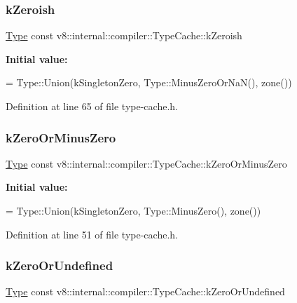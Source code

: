 \subsubsection{\texorpdfstring{k\+Zeroish}{kZeroish}}
{\footnotesize\ttfamily \mbox{\hyperlink{classv8_1_1internal_1_1compiler_1_1Type}{Type}} const v8\+::internal\+::compiler\+::\+Type\+Cache\+::k\+Zeroish}

{\bfseries Initial value\+:}
\begin{DoxyCode}
=
      Type::Union(kSingletonZero, Type::MinusZeroOrNaN(), zone())
\end{DoxyCode}


Definition at line 65 of file type-\/cache.\+h.

\mbox{\label{classv8_1_1internal_1_1compiler_1_1TypeCache_ac8e5152fb515d02faeb5650bd11cebf5}} 
\subsubsection{\texorpdfstring{k\+Zero\+Or\+Minus\+Zero}{kZeroOrMinusZero}}
{\footnotesize\ttfamily \mbox{\hyperlink{classv8_1_1internal_1_1compiler_1_1Type}{Type}} const v8\+::internal\+::compiler\+::\+Type\+Cache\+::k\+Zero\+Or\+Minus\+Zero}

{\bfseries Initial value\+:}
\begin{DoxyCode}
=
      Type::Union(kSingletonZero, Type::MinusZero(), zone())
\end{DoxyCode}


Definition at line 51 of file type-\/cache.\+h.

\mbox{\label{classv8_1_1internal_1_1compiler_1_1TypeCache_ac5f7b54dbb0261f5fe655afc2cacce80}} 
\subsubsection{\texorpdfstring{k\+Zero\+Or\+Undefined}{kZeroOrUndefined}}
{\footnotesize\ttfamily \mbox{\hyperlink{classv8_1_1internal_1_1compiler_1_1Type}{Type}} const v8\+::internal\+::compiler\+::\+Type\+Cache\+::k\+Zero\+Or\+Undefined}

